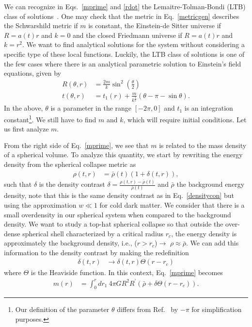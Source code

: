 \documentclass[a4paper,11pt]{article}
\begin{document}
We can recognize in Eqs.~\eqref{mprime} and \eqref{rdot} the Lemaitre-Tolman-Bondi (LTB)
class of solutions~\cite{Lemaitre1933}. One may check that the metric in
Eq.~\eqref{metricgen} describes the Schwarshild metric if $m$ is constant, the
Einstein-de Sitter universe if $R = a(t)r$ and $k=0$ and the closed Friedmann universe
if $R= a(t)r$ and $k = r^2$. We want to find analytical solutions for the system without
considering a specific type of these local functions. Luckily, the LTB class of
solutions is one of the few cases where there is an analytical parametric solution to
Einstein's field equations, given by
\begin{align}
	\label{ltb1}
	R(\theta, r) & = \frac{2m}{k}\sin^2\left(\frac{\theta}{2}\right)                          \\
	\label{ltb2}
	t(\theta, r) & = t_1(r) + \frac{m}{k^{\frac{3}{2}}}\left(\theta - \pi - \sin\theta\right)
	.\end{align}
In the above, $\theta$ is a parameter in the range $[-2\pi, 0]$ and $t_1$ is an
integration constant\footnote{Our definition of the parameter $\theta$ differs from
	Ref.~\cite{Martin2020} by $-\pi$ for simplification purposes.}. We still have to find
$m$ and $k$, which will require initial conditions. Let us first analyze $m$.

From the right side of Eq.~\eqref{mprime}, we see that $m$ is related to the mass
density of a spherical volume. To analyze this quantity, we start by rewriting the
energy density from the spherical collapse metric as
\begin{align}
	\rho(t, r) & = \bar{\rho}(t)(1 + \delta(t,r))
	,\end{align}
such that $\delta$ is the density contrast $\delta = \frac{\rho(t,r) -
		\bar{\rho}(t)}{\bar{\rho}(t)}$ and $\bar{\rho}$ the background energy density,
{\color{red} note that this is the same density contrast as in
		Eq.~\eqref{densitycon} but using the approximation $w \ll 1$ for cold dark
		matter.} We consider that there is a small overdensity in our spherical system
when compared to the background density. We want to study a top-hat spherical
collapse so that outside the over-dense spherical shell characterized by a
critical radius $r_c$, the energy density is approximately the background
density, i.e., ($r > r_c$)$\rightarrow$ $\rho \approx \bar{\rho}$. We can add
this information to the density contrast by making the redefinition
\begin{align}
	\delta(t, r) & \rightarrow \delta(t, r) \Theta(r-r_c)
\end{align}
where $\Theta$ is the Heaviside function. In this context, Eq.~\eqref{mprime} becomes
\begin{align}
	m(r) & = \int_0^r dr_1~ 4\pi GR^2R^\prime \left(\bar{\rho} + \delta \Theta(r-r_c)\right).
\end{align}
\end{document}
